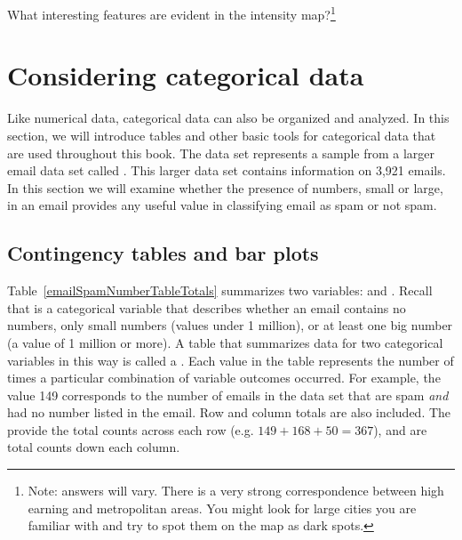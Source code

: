 \begin{exercise}
What interesting features are evident in the  intensity map?\footnote{Note: answers will vary. There is a very strong correspondence between high earning and metropolitan areas. You might look for large cities you are familiar with and try to spot them on the map as dark spots.}
\end{exercise}



\section{Considering categorical data}
\label{categoricalData}


Like numerical data, categorical data can also be organized and analyzed. In this section, we will introduce tables and other basic tools for categorical data that are used throughout this book. The  data set represents a sample from a larger email data set called . This larger data set contains information on 3,921 emails. In this section we will examine whether the presence of numbers, small or large, in an email provides any useful value in classifying email as spam or not spam.

\subsection{Contingency tables and bar plots}

Table~\ref{emailSpamNumberTableTotals} summarizes two variables:  and . Recall that  is a categorical variable that describes whether an email contains no numbers, only small numbers (values under 1 million), or at least one big number (a value of 1 million or more). A table that summarizes data for two categorical variables in this way is called a . Each value in the table represents the number of times a particular combination of variable outcomes occurred. For example, the value 149 corresponds to the number of emails in the data set that are spam \emph{and} had no number listed in the email. Row and column totals are also included. The   provide the total counts across each row (e.g. $149 + 168 + 50 = 367$), and   are total counts down each column.

